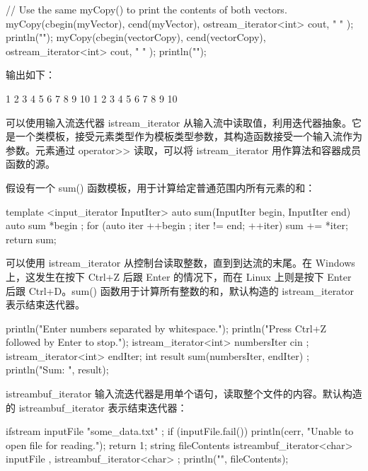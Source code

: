 \begin{cpp}
// Use the same myCopy() to print the contents of both vectors.
myCopy(cbegin(myVector), cend(myVector), ostream_iterator<int> { cout, " " });
println("");
myCopy(cbegin(vectorCopy), cend(vectorCopy), ostream_iterator<int> { cout, " " });
println("");
\end{cpp}

输出如下：

\begin{shell}
1 2 3 4 5 6 7 8 9 10
1 2 3 4 5 6 7 8 9 10
\end{shell}


可以使用输入流迭代器 istream\_iterator 从输入流中读取值，利用迭代器抽象。它是一个类模板，接受元素类型作为模板类型参数，其构造函数接受一个输入流作为参数。元素通过 operator>{}> 读取，可以将 istream\_iterator 用作算法和容器成员函数的源。

假设有一个 sum() 函数模板，用于计算给定普通范围内所有元素的和：

\begin{cpp}
template <input_iterator InputIter>
auto sum(InputIter begin, InputIter end)
{
    auto sum { *begin };
    for (auto iter { ++begin }; iter != end; ++iter) { sum += *iter; }
    return sum;
}
\end{cpp}

可以使用 istream\_iterator 从控制台读取整数，直到到达流的末尾。在 Windows 上，这发生在按下 Ctrl+Z 后跟 Enter 的情况下，而在 Linux 上则是按下 Enter 后跟 Ctrl+D。sum() 函数用于计算所有整数的和，默认构造的 istream\_iterator 表示结束迭代器。

\begin{cpp}
println("Enter numbers separated by whitespace.");
println("Press Ctrl+Z followed by Enter to stop.");
istream_iterator<int> numbersIter { cin };
istream_iterator<int> endIter;
int result { sum(numbersIter, endIter) };
println("Sum: {}", result);
\end{cpp}



istreambuf\_iterator 输入流迭代器是用单个语句，读取整个文件的内容。默认构造的 istreambuf\_iterator 表示结束迭代器：

\begin{cpp}
ifstream inputFile { "some_data.txt" };
if (inputFile.fail()) {
    println(cerr, "Unable to open file for reading.");
    return 1;
}
string fileContents {
    istreambuf_iterator<char> { inputFile },
    istreambuf_iterator<char> { }
};
println("{}", fileContents);
\end{cpp}














